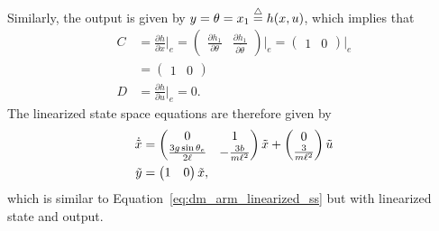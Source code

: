 Similarly, the output is given by $y=\theta = x_1 \stackrel{\triangle}{=} h(x,u)$, which implies that
\begin{align*}
C &= \frac{\partial h}{\partial x}\Big|_e = \begin{pmatrix} \frac{\partial h_1}{\partial \theta} & \frac{\partial h_1}{\partial \dot{\theta}} \end{pmatrix}\Big|_e 
= \begin{pmatrix} 1 & 0 \end{pmatrix}\Big|_e \\
&= \begin{pmatrix} 1 & 0 \end{pmatrix} \\
D &= \frac{\partial h}{\partial u}\Big|_e = 0.
\end{align*}
The linearized state space equations are therefore given by
\begin{align*}
\dot{\tilde{x}} &= \begin{pmatrix} 0 & 1 \\ \frac{3g\sin\theta_e}{2\ell} & -\frac{3b}{m\ell^2} \end{pmatrix} \tilde{x} + \begin{pmatrix} 0 \\ \frac{3}{m\ell^2} \end{pmatrix} \tilde{u} 
\notag \\
\tilde{y} &= \begin{pmatrix} 1 & 0\end{pmatrix} \tilde{x},
\end{align*}
which is similar to Equation~\eqref{eq:dm_arm_linearized_ss} but with linearized state and output.


